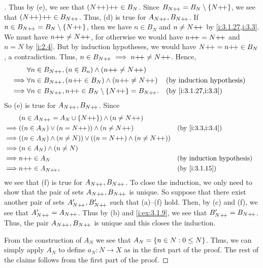 \begin{proof}[]
  Thus by (e), we see that \((N{+}\!{+}){+}\!{+} \in B_N\).
  Since \(B_{N{+}\!{+}} = B_N \setminus \left\lbrace N{+}\!{+}\right\rbrace\), we see that \((N{+}\!{+}){+}\!{+} \in B_{N{+}\!{+}}\).
  Thus, (d) is true for \(A_{N{+}\!{+}}, B_{N{+}\!{+}}\).
  If \(n \in B_{N{+}\!{+}} = B_N \setminus \left\lbrace N{+}\!{+}\right\rbrace\), then we have \(n \in B_N\) and \(n \neq N{+}\!{+}\) by \cref{i:3.1.27,i:3.3}.
  We must have \(n{+}\!{+} \neq N{+}\!{+}\), for otherwise we would have \(n{+}\!{+} = N{+}\!{+}\) and \(n = N\) by \cref{i:2.4}.
  But by induction hypotheses, we would have \(N{+}\!{+} = n{+}\!{+} \in B_N\), a contradiction.
  Thus, \(n \in B_{N{+}\!{+}} \implies n{+}\!{+} \neq N{+}\!{+}\).
  Hence,
  \begin{align*}
             & \forall n \in B_{N\pp}, (n \in B_n) \land (n\pp \neq N\pp)                                     \\
    \implies & \forall n \in B_{N\pp}, (n\pp \in B_N) \land (n\pp \neq N\pp)         &  & \byIH               \\
    \implies & \forall n \in B_{N\pp}, n\pp \in B_N \setminus \set{N\pp} = B_{N\pp}. &  & \by{i:3.1.27,i:3.3}
  \end{align*}
  So (e) is true for \(A_{N{+}\!{+}}, B_{N{+}\!{+}}\).
  Since
  \begin{align*}
             & (n \in A_{N\pp} = A_N \cup \set{N\pp}) \land (n \neq N\pp)                                 \\
    \implies & ((n \in A_N) \lor (n = N\pp)) \land (n \neq N\pp)                    &  & \by{i:3.3,i:3.4} \\
    \implies & ((n \in A_N) \land (n \neq N)) \lor ((n = N\pp) \land (n \neq N\pp))                       \\
    \implies & (n \in A_N) \land (n \neq N)                                                               \\
    \implies & n\pp \in A_N                                                         &  & \byIH            \\
    \implies & n\pp \in A_{N\pp},                                                   &  & \by{i:3.1.15}
  \end{align*}
  we see that (f) is true for \(A_{N{+}\!{+}}, B_{N{+}\!{+}}\).
  To close the induction, we only need to show that the pair of sets \(A_{N{+}\!{+}}, B_{N{+}\!{+}}\) is unique.
  So suppose that there exist another pair of sets \(A_{N{+}\!{+}}', B_{N{+}\!{+}}'\) such that (a)--(f) hold.
  Then, by (c) and (f), we see that \(A_{N{+}\!{+}}' = A_{N{+}\!{+}}\).
  Thus by (b) and \cref{i:ex:3.1.9}, we see that \(B_{N{+}\!{+}}' = B_{N{+}\!{+}}\).
  Thus, the pair \(A_{N{+}\!{+}}, B_{N{+}\!{+}}\) is unique and this closes the induction.

  From the construction of \(A_N\) we see that \(A_N = \left\lbrace n \in N : 0 \leq N\right\rbrace\).
  Thus, we can simply apply \(A_N\) to define \(a_N : N \to X\) as in the first part of the proof.
  The rest of the claims follows from the first part of the proof.
\end{proof}

